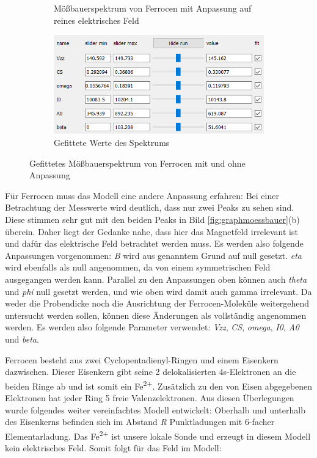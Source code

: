 \documentclass[german, %
parskip=full, %
bibliography=totoc, %
]{scrartcl}
\begin{document}
\begin{figure}[ht]
\begin{subfigure}[b]{0.5\textwidth}
	  \caption{Mößbauerspektrum von Ferrocen mit Anpassung auf reines elektrisches Feld}
	  \label{fig:moessferrocen}
  \end{subfigure}
  \begin{subfigure}[b]{0.4\textwidth}
	  \includegraphics[width=\textwidth]{WerteFerrocen}
	  \caption{Gefittete Werte des Spektrums}
	  \label{fig:werteferrocen}
  \end{subfigure}
	\caption{Gefittetes Mößbauerspektrum von Ferrocen mit und ohne Anpassung}
	\label{fig:ferrocen}
\end{figure}

Für Ferrocen muss das Modell eine andere Anpassung erfahren: Bei einer Betrachtung der Messwerte wird deutlich, dass nur zwei Peaks zu sehen sind. Diese stimmen sehr gut mit den beiden Peaks in Bild \ref{fig:graphmoessbauer}(b) überein. Daher liegt der Gedanke nahe, dass hier das Magnetfeld irrelevant ist und dafür das elektrische Feld betrachtet werden muss. Es werden also folgende Anpassungen vorgenommen: \textit{B} wird aus genanntem Grund auf null gesetzt. \textit{eta} wird ebenfalls als null angenommen, da von einem symmetrischen Feld ausgegangen werden kann. Parallel zu den Anpassungen oben können auch \textit{theta} und \textit{phi} null gesetzt werden, und wie oben wird damit auch gamma irrelevant. Da weder die Probendicke noch die Ausrichtung der Ferrocen-Moleküle weitergehend untersucht werden sollen, können diese Änderungen als vollständig angenommen werden. Es werden also folgende Parameter verwendet: \textit{Vzz}, \textit{CS}, \textit{omega}, \textit{I0}, \textit{A0} und \textit{beta}.

Ferrocen besteht aus zwei Cyclopentadienyl-Ringen und einem Eisenkern dazwischen. Dieser Eisenkern gibt seine 2 delokalisierten 4s-Elektronen an die beiden Ringe ab und ist somit ein Fe\textsuperscript{2+}. Zusätzlich zu den von Eisen abgegebenen Elektronen hat jeder Ring 5 freie Valenzelektronen. Aus diesen Überlegungen wurde folgendes weiter vereinfachtes Modell entwickelt:
Oberhalb und unterhalb des Eisenkerns befinden sich im Abstand \textit{R} Punktladungen mit 6-facher Elementarladung. Das Fe\textsuperscript{2+} ist unsere lokale Sonde und erzeugt in diesem Modell kein elektrisches Feld.
Somit folgt für das Feld im Modell:
\end{document}
